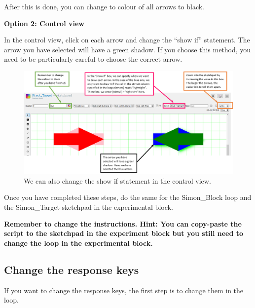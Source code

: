 \documentclass[
]{book}
\begin{document}
After this is done, you can change to colour of all arrows to black.

\textbf{Option 2: Control view}

In the control view, click on each arrow and change the ``show if'' statement. The arrow you have selected will have a green shadow. If you choose this method, you need to be particularly careful to choose the correct arrow.

\begin{figure}

{\centering \includegraphics[width=0.99\linewidth]{images/changesimon/08option2} 

}

\caption{We can also change the show if statement in the control view.}\label{fig:Figure3-14}
\end{figure}

Once you have completed these steps, do the same for the Simon\_Block loop and the Simon\_Target sketchpad in the experimental block.

\textbf{Remember to change the instructions. Hint: You can copy-paste the script to the sketchpad in the experiment block but you still need to change the loop in the experimental block.}

\hypertarget{change-the-response-keys}{%
\subsection{Change the response keys}\label{change-the-response-keys}}

If you want to change the response keys, the first step is to change them in the loop.
\end{document}
